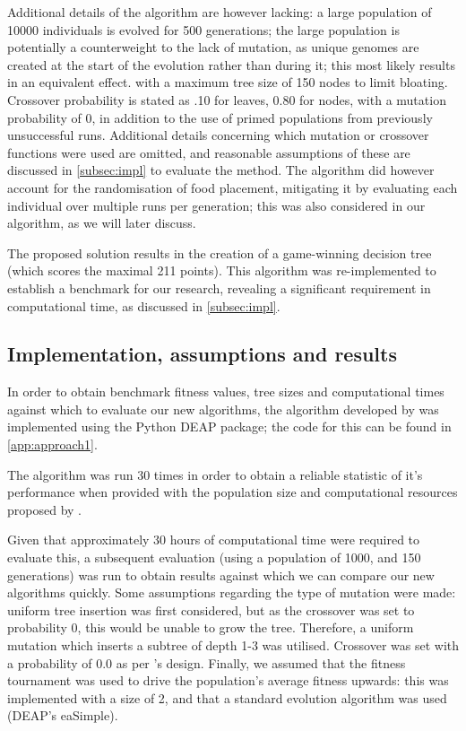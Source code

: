 \documentclass[british,10pt,a4paper]{article}
\begin{document}
Additional details of the algorithm are however lacking: a large population of 10000 individuals is evolved for 500 generations; the large population is potentially a counterweight to the lack of mutation, as unique genomes are created at the start of the evolution rather than during it; this most likely results in an equivalent effect. with a maximum tree size of 150 nodes to limit bloating. Crossover probability is stated as .10 for leaves, 0.80 for nodes, with a mutation probability of 0, in addition to the use of primed populations from previously unsuccessful runs. Additional details concerning which mutation or crossover functions were used are omitted, and reasonable assumptions of these are discussed in \autoref{subsec:impl} to evaluate the method. The algorithm did however account for the randomisation of food placement, mitigating it by evaluating each individual over multiple runs per generation; this was also considered in our algorithm, as we will later discuss.\newline

The proposed solution results in the creation of a game-winning decision tree (which scores the maximal 211 points). This algorithm was re-implemented to establish a benchmark for our research, revealing a significant requirement in computational time, as discussed in \autoref{subsec:impl}.

\subsection{Implementation, assumptions and results}
\label{subsec:impl}

In order to obtain benchmark fitness values, tree sizes and computational times against which to evaluate our new algorithms, the algorithm developed by \citeauthor{Ehlis2000-sz} was implemented using the Python DEAP \cite{deap} package; the code for this can be found in \autoref{app:approach1}. \newline



The algorithm was run 30 times in order to obtain a reliable statistic of it's performance when provided with the population size and computational resources proposed by \citeauthor{Ehlis2000-sz}.



Given that approximately 30 hours of computational time were required to evaluate this, a subsequent evaluation (using a population of 1000, and 150 generations) was run to obtain results against which we can compare our new algorithms quickly. Some assumptions regarding the type of mutation were made: uniform tree insertion was first considered, but as the crossover was set to probability 0, this would be unable to grow the tree. Therefore, a uniform mutation which inserts a subtree of depth 1-3 was utilised. Crossover was set with a probability of 0.0 as per \citeauthor{Ehlis2000-sz}'s design. Finally, we assumed that the fitness tournament was used to drive the population's average fitness upwards: this was implemented with a size of 2, and that a standard evolution algorithm was used (DEAP's eaSimple).\newline
\end{document}
